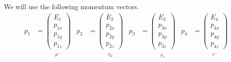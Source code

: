 \documentclass[12pt]{article}
\begin{document}
We will use the following momentum vectors.
\begin{align*}
p_1&=
\underset{\substack{\\[1ex] \mu^-}}
{\begin{pmatrix}E_1\\p_{1x}\\p_{1y}\\p_{1z}\end{pmatrix}}
&
p_2&=
\underset{\substack{\\[1ex] \nu_\mu}}
{\begin{pmatrix}E_2\\p_{2x}\\p_{2y}\\p_{2z}\end{pmatrix}}
&
p_3&=
\underset{\substack{\\[1ex] \bar{\nu}_e}}
{\begin{pmatrix}E_3\\p_{3x}\\p_{3y}\\p_{3z}\end{pmatrix}}
&
p_4&=
\underset{\substack{\\[1ex] e^-}}
{\begin{pmatrix}E_4\\p_{4x}\\p_{4y}\\p_{4z}\end{pmatrix}}
\end{align*}
\end{document}
